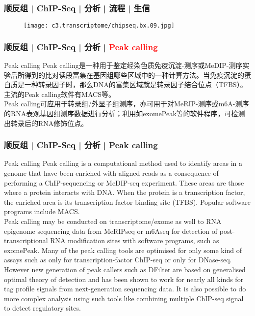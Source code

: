 \begin{frame}
  \frametitle{顺反组 | ChIP-Seq | 分析 | 流程 | 生信}
  \begin{figure}
    \centering
    \texttt{[image: c3.transcriptome/chipseq.bx.09.jpg]}
  \end{figure}
\end{frame}

\begin{frame}
  \frametitle{顺反组 | ChIP-Seq | 分析 | \textcolor{red}{Peak calling}}
  \begin{block}{Peak calling}
    Peak calling是一种用于鉴定经染色质免疫沉淀-测序或MeDIP-测序实验后所得到的比对读段富集在基因组哪些区域中的一种计算方法。当免疫沉淀的蛋白质是一种转录因子时，那么DNA的富集区域就是转录因子结合位点（TFBS）。主流的Peak calling软件有MACS等。\\
    \vspace{1em}
    Peak calling可应用于转录组/外显子组测序，亦可用于对MeRIP-测序或m6A-测序的RNA表观基因组测序数据进行分析；利用如exomePeak等的软件程序，可检测出转录后的RNA修饰位点。
  \end{block}
\end{frame}

\begin{frame}
  \frametitle{顺反组 | ChIP-Seq | 分析 | Peak calling}
  {\footnotesize
  \begin{block}{Peak calling}
    Peak calling is a computational method used to identify areas in a genome that have been enriched with aligned reads as a consequence of performing a ChIP-sequencing or MeDIP-seq experiment. These areas are those where a protein interacts with DNA. When the protein is a transcription factor, the enriched area is its transcription factor binding site (TFBS). Popular software programs include MACS.\\
    \vspace{1em}
    Peak calling may be conducted on transcriptome/exome as well to RNA epigenome sequencing data from MeRIPseq or m6Aseq for detection of post-transcriptional RNA modification sites with software programs, such as exomePeak. Many of the peak calling tools are optimised for only some kind of assays such as only for transcription-factor ChIP-seq or only for DNase-seq. However new generation of peak callers such as DFilter are based on generalised optimal theory of detection and has been shown to work for nearly all kinds for tag profile signals from next-generation sequencing data. It is also possible to do more complex analysis using such tools like combining multiple ChIP-seq signal to detect regulatory sites.
  \end{block}
  }
\end{frame}

